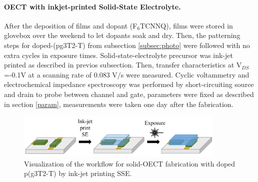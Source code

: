 \paragraph{OECT with inkjet-printed Solid-State Electrolyte.}After the deposition of films and dopant (F$_{6}$TCNNQ), films were stored in glovebox over the weekend to let dopants soak and dry. Then, the patterning steps for doped-(pg3T2-T) from subsection \ref{subsec:photo} were followed with no extra cycles in exposure times. Solid-state-electrolyte precursor was ink-jet printed as described in previos subsection. Then, transfer characteristics at V$_{DS}$=-0.1V at a scanning rate of 0.083 V/s were measured. Cyclic voltammetry and electrochemical impedance spectroscopy was performed by short-circuiting source and drain to probe between channel and gate, parameters were fixed as described in section \ref{param}, measurements were taken one day after the fabrication.

\begin{figure}[!ht]
	\centering
	\includegraphics[width=10cm]{Images/pdf/doped-sse.pdf}
	\caption[Solid-OECT fabrication with doped p(g3T2-T)]{Visualization of the workflow for solid-OECT fabrication with doped p(g3T2-T) by ink-jet printing SSE.}
	\label{fig:dopedsse}
\end{figure}

